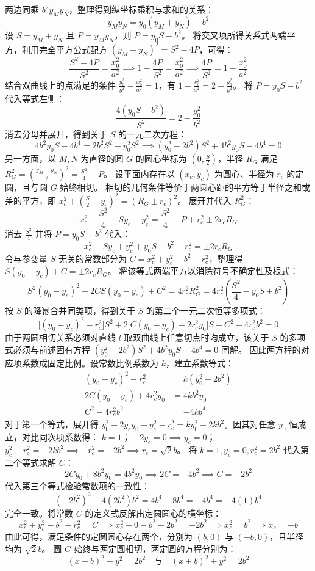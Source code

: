\begin{solution}
两边同乘 $b^2 y_M y_N$，整理得到纵坐标乘积与求和的关系：
$$ y_M y_N = y_0(y_M + y_N) - b^2 $$
设 $S = y_M + y_N$ 且 $P = y_M y_N$，则 $P = y_0 S - b^2$。
将交叉项所得关系式两端平方，利用完全平方公式配方 $(y_M - y_N)^2 = S^2 - 4P$，可得：
$$ \frac{S^2 - 4P}{S^2} = \frac{x_0^2}{a^2} \implies 1 - \frac{4P}{S^2} = \frac{x_0^2}{a^2} \implies \frac{4P}{S^2} = 1 - \frac{x_0^2}{a^2} $$
结合双曲线上的点满足的条件 $\frac{y_0^2}{b^2} - \frac{x_0^2}{a^2} = 1$，有 $1 - \frac{x_0^2}{a^2} = 2 - \frac{y_0^2}{b^2}$。
将 $P = y_0 S - b^2$ 代入等式左侧：
$$ \frac{4(y_0 S - b^2)}{S^2} = 2 - \frac{y_0^2}{b^2} $$
消去分母并展开，得到关于 $S$ 的一元二次方程：
$$ 4b^2 y_0 S - 4b^4 = 2b^2 S^2 - y_0^2 S^2 \implies (y_0^2 - 2b^2)S^2 + 4b^2 y_0 S - 4b^4 = 0 $$
另一方面，以 $M, N$ 为直径的圆 $G$ 的圆心坐标为 $\left(0, \frac{S}{2}\right)$，半径 $R_G$ 满足 $R_G^2 = \left(\frac{y_M - y_N}{2}\right)^2 = \frac{S^2}{4} - P$。
设平面内存在以 $(x_c, y_c)$ 为圆心、半径为 $r_c$ 的定圆，且与圆 $G$ 始终相切。
相切的几何条件等价于两圆心距的平方等于半径之和或差的平方，即 $x_c^2 + \left(\frac{S}{2} - y_c\right)^2 = (R_G \pm r_c)^2$。
展开并代入 $R_G^2$：
$$ x_c^2 + \frac{S^2}{4} - S y_c + y_c^2 = \frac{S^2}{4} - P + r_c^2 \pm 2r_c R_G $$
消去 $\frac{S^2}{4}$ 并将 $P = y_0 S - b^2$ 代入：
$$ x_c^2 - S y_c + y_c^2 + y_0 S - b^2 - r_c^2 = \pm 2r_c R_G $$
令与参变量 $S$ 无关的常数部分为 $C = x_c^2 + y_c^2 - b^2 - r_c^2$，整理得 $S(y_0 - y_c) + C = \pm 2r_c R_G$。
将该等式两端平方以消除符号不确定性及根式：
$$ S^2(y_0 - y_c)^2 + 2C S(y_0 - y_c) + C^2 = 4r_c^2 R_G^2 = 4r_c^2 \left(\frac{S^2}{4} - y_0 S + b^2\right) $$
按 $S$ 的降幂合并同类项，得到关于 $S$ 的第二个一元二次恒等多项式：
$$ \big[(y_0 - y_c)^2 - r_c^2\big]S^2 + 2\big[C(y_0 - y_c) + 2r_c^2 y_0\big]S + C^2 - 4r_c^2 b^2 = 0 $$
由于两圆相切关系必须对直线 $l$ 取双曲线上任意切点时均成立，该关于 $S$ 的多项式必须与前述固有方程 $(y_0^2 - 2b^2)S^2 + 4b^2 y_0 S - 4b^4 = 0$ 同解。
因此两方程的对应项系数成固定比例。设常数比例系数为 $k$，建立系数等式：
\begin{align*}
(y_0 - y_c)^2 - r_c^2 &= k(y_0^2 - 2b^2) \\
2C(y_0 - y_c) + 4r_c^2 y_0 &= 4k b^2 y_0 \\
C^2 - 4r_c^2 b^2 &= -4k b^4
\end{align*}
对于第一个等式，展开得 $y_0^2 - 2y_c y_0 + y_c^2 - r_c^2 = k y_0^2 - 2k b^2$。因其对任意 $y_0$ 恒成立，对比同次项系数得：
$k = 1$；
$-2y_c = 0 \implies y_c = 0$；
$y_c^2 - r_c^2 = -2k b^2 \implies -r_c^2 = -2b^2 \implies r_c = \sqrt{2}b$。
将 $k = 1, y_c = 0, r_c^2 = 2b^2$ 代入第二个等式求解 $C$：
$$ 2C y_0 + 8b^2 y_0 = 4b^2 y_0 \implies 2C = -4b^2 \implies C = -2b^2 $$
代入第三个等式检验常数项的一致性：
$$ (-2b^2)^2 - 4(2b^2)b^2 = 4b^4 - 8b^4 = -4b^4 = -4(1)b^4 $$
完全一致。将常数 $C$ 的定义式反解出定圆圆心的横坐标：
$$ x_c^2 + y_c^2 - b^2 - r_c^2 = C \implies x_c^2 + 0 - b^2 - 2b^2 = -2b^2 \implies x_c^2 = b^2 \implies x_c = \pm b $$
由此可得，满足条件的定圆圆心存在两个，分别为 $(b, 0)$ 与 $(-b, 0)$，且半径均为 $\sqrt{2}b$。
圆 $G$ 始终与两定圆相切，两定圆的方程分别为：
$$ (x - b)^2 + y^2 = 2b^2 \quad \text{与} \quad (x + b)^2 + y^2 = 2b^2 $$
\end{solution}

